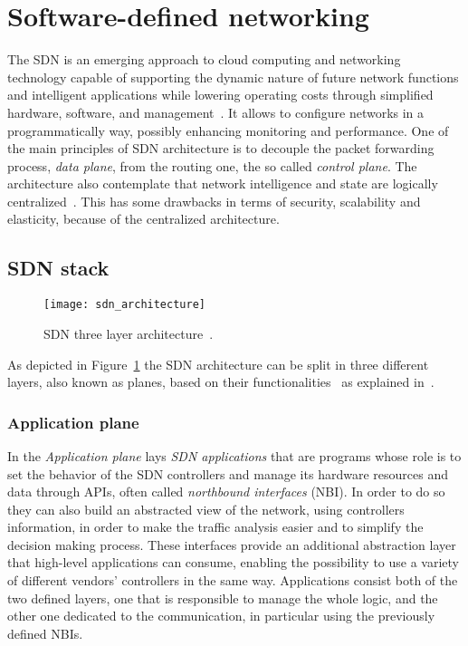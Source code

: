 \section{Software-defined networking}
The SDN is an emerging approach to cloud computing and networking technology
capable of supporting the dynamic nature of future network functions and
intelligent applications while lowering operating costs through simplified
hardware, software, and management~\cite{sezer2013we}. It allows to configure
networks in a programmatically way, possibly enhancing monitoring and
performance. One of the main principles of SDN architecture is to decouple the
packet forwarding process, \emph{data plane}, from the routing one, the so
called \emph{control plane}. The architecture also contemplate that network
intelligence and state are logically centralized~\cite{fundation2012software}. 
This has some drawbacks in terms of security, scalability and elasticity,
because of the centralized architecture.

\subsection{SDN stack}
\begin{figure}[ht]
 \centering
 \texttt{[image: sdn\_architecture]}
 \caption[SDN three layer architecture]{SDN three layer
          architecture~\cite{fundation2013software}.}
 \label{chap:background:img:sdn_architecture}
\end{figure}
As depicted in Figure~\ref{chap:background:img:sdn_architecture} the SDN
architecture can be split in three different layers, also known as planes,
based on their functionalities~\cite{fundation2012software} as explained
in~\cite{fundation2013software}.

\subsubsection{Application plane}

In the \emph{Application plane} lays \emph{SDN applications} that are programs
whose role is to set the behavior of the SDN controllers 
and manage its hardware resources and data through APIs, often called 
\emph{northbound interfaces} (NBI). In order to do so they can also build an
abstracted view of the network, using controllers information, in order to make
the traffic analysis easier and to simplify the decision making process.
These interfaces provide an additional abstraction layer that high-level 
applications can consume, enabling the possibility to use a variety of 
different vendors' controllers in the same way. Applications consist both of
the two defined layers, one that is responsible to manage the whole logic, and
the other one dedicated to the communication, in particular using the previously
defined NBIs.

